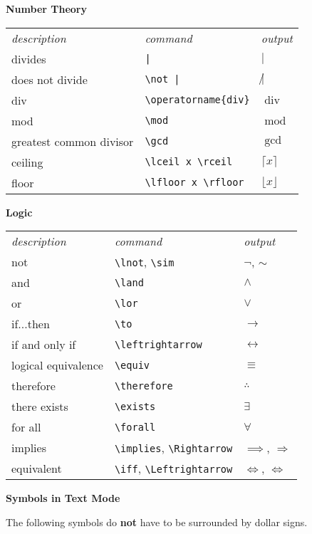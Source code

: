 \documentclass[10pt,landscape]{article}
\newcommand{\ColorSection}[1]{\par\vspace{1.5ex}\noindent\textcolor{sectioncolor}{\Large\bfseries #1}\par\vspace{0.75ex}}
\newcommand{\ColorSubsection}[1]{\par\vspace{1ex}\noindent\textcolor{subsectioncolor}{\normalsize\bfseries #1}\par\vspace{0.5ex}}
\begin{document}
\begin{multicols}{3}
\columnbreak
\ColorSubsection{Number Theory}
\begin{tabular}{lll}
\emph{description} & \emph{command} & \emph{output}\\
divides & \verb!|! & \(|\)\\
does not divide & \verb!\not |! & \(\not |\)\\
div & \verb!\operatorname{div}! & \(\operatorname{div}\)\\
mod & \verb!\mod! & \(\operatorname{mod}\)\\
greatest common divisor & \verb!\gcd! & \(\gcd\)\\
ceiling & \verb!\lceil x \rceil! & \(\lceil x\rceil\)\\
floor & \verb!\lfloor x \rfloor! & \(\lfloor x \rfloor\)\\
\end{tabular}




\ColorSubsection{Logic}
\begin{tabular}{lll}
\emph{description} & \emph{command} & \emph{output}\\
not & \verb!\lnot!, \verb!\sim! & \(\lnot\), \(\sim\)\\
and & \verb!\land! & \(\land\)\\
or & \verb!\lor! & \(\lor\)\\
if...then & \verb!\to! & \(\to\)\\
if and only if & \verb!\leftrightarrow! & \(\leftrightarrow\)\\
logical equivalence & \verb!\equiv! & \(\equiv\)\\
therefore & \verb!\therefore! & \(\therefore\)\\
there exists  & \verb!\exists! & \(\exists\)\\
for all & \verb!\forall! & \(\forall\)\\
implies & \verb!\implies!, \verb!\Rightarrow! & \(\implies\), \(\Rightarrow\)\\
equivalent & \verb!\iff!, \verb!\Leftrightarrow! & \(\iff\), \(\Leftrightarrow\)
\end{tabular}


\ColorSection{Symbols in Text Mode}

The following symbols do \textbf{not} have to be surrounded by dollar signs.


\end{multicols}
\end{document}
